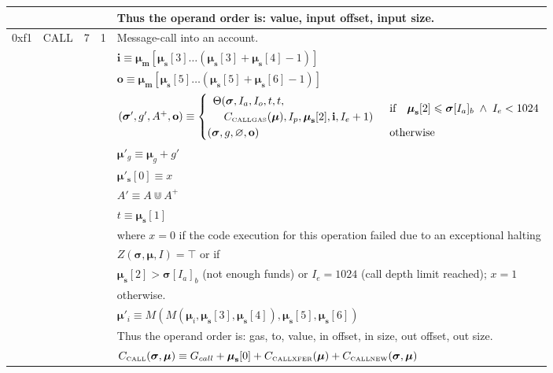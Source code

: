 \documentclass[9pt,oneside]{amsart}
\begin{document}
\begin{tabular*}{\columnwidth}[h]{rlrrl}
&&&& Thus the operand order is: value, input offset, input size. \\
\midrule
0xf1 & {\small CALL} & 7 & 1 & Message-call into an account. \\
&&&& $\mathbf{i} \equiv \boldsymbol{\mu}_\mathbf{m}[ \boldsymbol{\mu}_\mathbf{s}[3] \dots (\boldsymbol{\mu}_\mathbf{s}[3] + \boldsymbol{\mu}_\mathbf{s}[4] - 1) ]$ \\
&&&& $\mathbf{o} \equiv \boldsymbol{\mu}_\mathbf{m}[ \boldsymbol{\mu}_\mathbf{s}[5] \dots (\boldsymbol{\mu}_\mathbf{s}[5] + \boldsymbol{\mu}_\mathbf{s}[6] - 1) ]$ \\
&&&& $(\boldsymbol{\sigma}', g', A^+, \mathbf{o}) \equiv \begin{cases}\begin{array}{l}\Theta(\boldsymbol{\sigma}, I_a, I_o, t, t,\\ \quad C_{\text{\tiny CALLGAS}}(\boldsymbol{\mu}), I_p, \boldsymbol{\mu}_\mathbf{s}[2], \mathbf{i}, I_e + 1)\end{array} & \text{if} \quad \boldsymbol{\mu}_\mathbf{s}[2] \leqslant \boldsymbol{\sigma}[I_a]_b \;\wedge\; I_e < 1024\\ (\boldsymbol{\sigma}, g, \varnothing, \mathbf{o}) & \text{otherwise} \end{cases}$ \\
&&&& $\boldsymbol{\mu}'_g \equiv \boldsymbol{\mu}_g + g'$ \\
&&&& $\boldsymbol{\mu}'_\mathbf{s}[0] \equiv x$ \\
&&&& $A' \equiv A \Cup A^+$ \\
&&&& $t \equiv \boldsymbol{\mu}_\mathbf{s}[1]$ \\
&&&& where $x=0$ if the code execution for this operation failed due to an exceptional halting \\
&&&& $Z(\boldsymbol{\sigma}, \boldsymbol{\mu}, I) = \top$ or if  \\
&&&& $\boldsymbol{\mu}_\mathbf{s}[2] > \boldsymbol{\sigma}[I_a]_b$ (not enough funds) or $I_e = 1024$ (call depth limit reached); $x=1$ \\
&&&& otherwise. \\
&&&& $\boldsymbol{\mu}'_i \equiv M(M(\boldsymbol{\mu}_i, \boldsymbol{\mu}_\mathbf{s}[3], \boldsymbol{\mu}_\mathbf{s}[4]), \boldsymbol{\mu}_\mathbf{s}[5], \boldsymbol{\mu}_\mathbf{s}[6])$ \\
&&&& Thus the operand order is: gas, to, value, in offset, in size, out offset, out size. \\
&&&& $C_{\text{\tiny CALL}}(\boldsymbol{\sigma}, \boldsymbol{\mu}) \equiv G_{call} + \boldsymbol{\mu}_\mathbf{s}[0] + C_{\text{\tiny CALLXFER}}(\boldsymbol{\mu}) + C_{\text{\tiny CALLNEW}}(\boldsymbol{\sigma}, \boldsymbol{\mu})$ \\

\end{tabular*}
\end{document}
